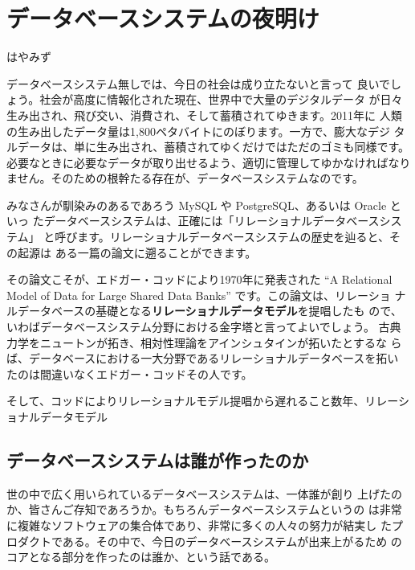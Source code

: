 
\cleardoublepage
\plainifnotempty

\chapter{データベースシステムの夜明け}

\begin{flushright}
はやみず
\end{flushright}

\lettrine{デ}ータベースシステム無しでは、今日の社会は成り立たないと言って
良いでしょう。社会が高度に情報化された現在、世界中で大量のデジタルデータ
が日々生み出され、飛び交い、消費され、そして蓄積されてゆきます。2011年に
人類の生み出したデータ量は1,800ペタバイトにのぼります。一方で、膨大なデジ
タルデータは、単に生み出され、蓄積されてゆくだけではただのゴミも同様です。
必要なときに必要なデータが取り出せるよう、適切に管理してゆかなければなり
ません。そのための根幹たる存在が、データベースシステムなのです。

みなさんが馴染みのあるであろう MySQL や PostgreSQL、あるいは Oracle といっ
たデータベースシステムは、正確には「リレーショナルデータベースシステム」
と呼びます。リレーショナルデータベースシステムの歴史を辿ると、その起源は
ある一篇の論文に遡ることができます。

その論文こそが、エドガー・コッドにより1970年に発表された ``A Relational
Model of Data for Large Shared Data Banks'' です。この論文は、リレーショ
ナルデータベースの基礎となる{\bf リレーショナルデータモデル}を提唱したも
ので、いわばデータベースシステム分野における金字塔と言ってよいでしょう。
古典力学をニュートンが拓き、相対性理論をアインシュタインが拓いたとするな
らば、データベースにおける一大分野であるリレーショナルデータベースを拓い
たのは間違いなくエドガー・コッドその人です。

そして、コッドによりリレーショナルモデル提唱から遅れること数年、リレーショナルデータモデル

\section{データベースシステムは誰が作ったのか}

\lettrine{世}の中で広く用いられているデータベースシステムは、一体誰が創り
上げたのか、皆さんご存知であろうか。もちろんデータベースシステムというの
は非常に複雑なソフトウェアの集合体であり、非常に多くの人々の努力が結実し
たプロダクトである。その中で、今日のデータベースシステムが出来上がるため
のコアとなる部分を作ったのは誰か、という話である。

